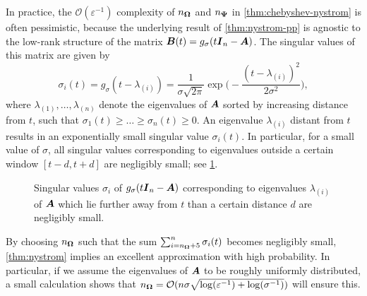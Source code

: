In practice, the $\mathcal{O}(\varepsilon^{-1})$ complexity of $n_{\boldsymbol{\Omega}}$ and $n_{\boldsymbol{\Psi}}$ in \cref{thm:chebyshev-nystrom} is often pessimistic, because  the underlying result of \cref{thm:nystrom-pp} is agnostic to the low-rank structure of the matrix $\boldsymbol{B}(t) = g_{\sigma}(t\boldsymbol{I}_n - \boldsymbol{A})$. The singular values of this matrix are given by
\begin{equation*}
    \sigma_i(t) = g_{\sigma}(t - \lambda_{(i)}) = \frac{1}{\sigma\sqrt{2 \pi}} \exp\Big( -\frac{(t - \lambda_{(i)})^2}{2 \sigma^2} \Big),  
    \label{equ:gaussian-kernel-eigenvalues}
\end{equation*}
where $\lambda_{(1)}, \dots, \lambda_{(n)}$ denote the eigenvalues of $\boldsymbol{A}$ sorted by increasing distance from $t$, such that $\sigma_1(t) \geq \dots \geq \sigma_n(t) \ge 0$. An eigenvalue $\lambda_{(i)}$ distant from $t$ results in an exponentially small singular value $\sigma_i(t)$. In particular, for a small value of $\sigma$, all singular values corresponding to eigenvalues outside a certain window $[t - d, t + d]$ are negligibly small; see \cref{fig:numerical-rank}.
\begin{figure}[ht]
    \centering
    
    \caption{Singular values $\sigma_i$ of $g_{\sigma}(t\boldsymbol{I}_n - \boldsymbol{A})$ corresponding to eigenvalues $\lambda_{(i)}$ of $\boldsymbol{A}$ which lie further away from $t$ than a certain distance $d$ are negligibly small.}
    \label{fig:numerical-rank}
\end{figure}
By choosing $n_{\boldsymbol{\Omega}}$ such that the sum $\sum_{i=n_{\boldsymbol{\Omega}}+5}^{n} \sigma_i(t)$ becomes negligibly small,  \cref{thm:nystrom} implies an excellent approximation with high probability. In particular, if we assume the eigenvalues of $\boldsymbol{A}$ to be roughly uniformly distributed, a small calculation shows that $n_{\boldsymbol{\Omega}} = \mathcal{O}(n \sigma \sqrt{\log(\varepsilon^{-1}) + \log(\sigma^{-1})})$ will ensure this.
